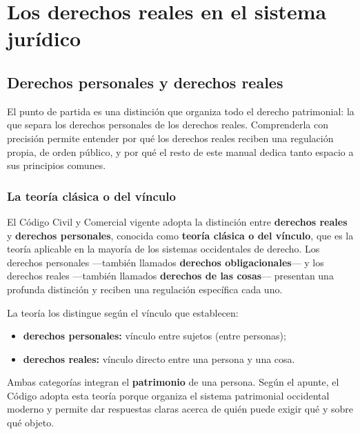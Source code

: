 \documentclass[12pt,oneside]{book}
\begin{document}
\part{Los derechos reales en el sistema jurídico}

\chapter[Derechos personales y derechos reales]{Derechos personales y derechos reales}\label{cap:dp-dr}

El punto de partida es una distinción que organiza todo el derecho patrimonial: la que separa los derechos personales de los derechos reales. Comprenderla con precisión permite entender por qué los derechos reales reciben una regulación propia, de orden público, y por qué el resto de este manual dedica tanto espacio a sus principios comunes.

\section{La teoría clásica o del vínculo}

El Código Civil y Comercial vigente adopta la distinción entre \textbf{derechos reales} y \textbf{derechos personales}, conocida como \textbf{teoría clásica o del vínculo}, que es la teoría aplicable en la mayoría de los sistemas occidentales de derecho. Los derechos personales ---también llamados \textbf{derechos obligacionales}--- y los derechos reales ---también llamados \textbf{derechos de las cosas}--- presentan una profunda distinción y reciben una regulación específica cada uno.

La teoría los distingue según el vínculo que establecen:

\begin{itemize}
    \item \textbf{derechos personales:} vínculo entre sujetos (entre personas);
    \item \textbf{derechos reales:} vínculo directo entre una persona y una cosa.
\end{itemize}

Ambas categorías integran el \textbf{patrimonio} de una persona. Según el apunte, el Código adopta esta teoría porque organiza el sistema patrimonial occidental moderno y permite dar respuestas claras acerca de quién puede exigir qué y sobre qué objeto.
\end{document}
